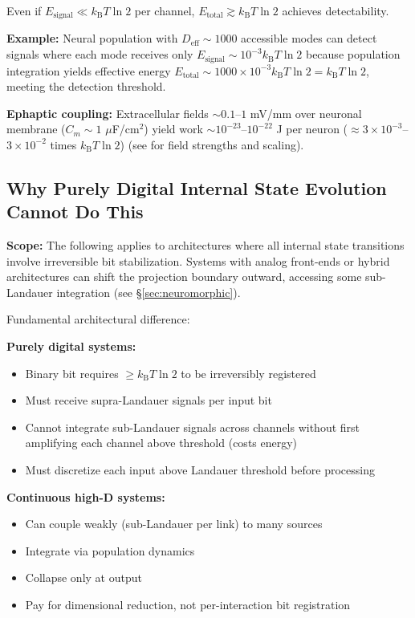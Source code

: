 \documentclass[12pt]{article}
\numberwithin{equation}{section}
\newcommand{\kB}{k_{\mathrm{B}}}
\begin{document}
Even if $E_{\text{signal}} \ll \kB T\ln2$ per channel, $E_{\text{total}} \gtrsim \kB T\ln2$ achieves detectability.

\textbf{Example:} Neural population with $D_{\text{eff}} \sim 1000$ accessible modes can detect signals where each mode receives only $E_{\text{signal}} \sim 10^{-3} \kB T\ln 2$ because population integration yields effective energy $E_{\text{total}} \sim 1000 \times 10^{-3} \kB T\ln 2 = \kB T\ln 2$, meeting the detection threshold.

\textbf{Ephaptic coupling:} Extracellular fields $\sim 0.1$--$1$ mV/mm over neuronal membrane ($C_m \sim 1$ $\mu$F/cm$^2$) yield work $\sim 10^{-23}$--$10^{-22}$ J per neuron ($\approx 3 \times 10^{-3}$--$3 \times 10^{-2}$ times $\kB T\ln 2$) (see \cite{anastassiou2011} for field strengths and scaling).

\subsection{Why Purely Digital Internal State Evolution Cannot Do This}

\textbf{Scope:} The following applies to architectures where all internal state transitions involve irreversible bit stabilization. Systems with analog front-ends or hybrid architectures can shift the projection boundary outward, accessing some sub-Landauer integration (see \S\ref{sec:neuromorphic}).

Fundamental architectural difference:

\textbf{Purely digital systems:}
\begin{itemize}
\item Binary bit requires $\ge \kB T\ln 2$ to be irreversibly registered
\item Must receive supra-Landauer signals per input bit
\item Cannot integrate sub-Landauer signals across channels without first amplifying each channel above threshold (costs energy)
\item Must discretize each input above Landauer threshold before processing
\end{itemize}

\textbf{Continuous high-D systems:}
\begin{itemize}
\item Can couple weakly (sub-Landauer per link) to many sources
\item Integrate via population dynamics
\item Collapse only at output
\item Pay for dimensional reduction, not per-interaction bit registration
\end{itemize}
\end{document}
